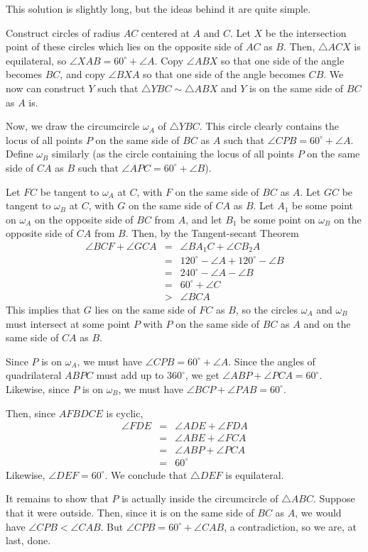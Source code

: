 \begin{mdsoln}
This solution is slightly long, but the ideas behind it are quite simple.

Construct circles of radius $AC$ centered at $A$ and $C$. Let $X$ be the intersection point of these circles which lies on the opposite side of $AC$ as $B$. Then, $\triangle ACX$ is equilateral, so $\angle XAB=60^\circ+\angle A$. Copy $\angle ABX$ so that one side of the angle becomes $BC$, and copy $\angle BXA$ so that one side of the angle becomes $CB$. We now can construct $Y$ such that $\triangle YBC\sim \triangle ABX$ and $Y$ is on the same side of $BC$ as $A$ is.

Now, we draw the circumcircle $\omega_A$ of $\triangle YBC$. This circle clearly contains the locus of all points $P$ on the same side of $BC$ as $A$ such that $\angle CPB=60^\circ+\angle A$. Define $\omega_B$ similarly (as the circle containing the locus of all points $P$ on the same side of $CA$ as $B$ such that $\angle APC=60^\circ+\angle B$).

Let $FC$ be tangent to $\omega_A$ at $C$, with $F$ on the same side of $BC$ as $A$. Let $GC$ be tangent to $\omega_B$ at $C$, with $G$ on the same side of $CA$ as $B$. Let $A_1$ be some point on $\omega_A$ on the opposite side of $BC$ from $A$, and let $B_1$ be some point on $\omega_B$ on the opposite side of $CA$ from $B$. Then, by the Tangent-secant Theorem\begin{eqnarray*}\angle BCF+\angle GCA&=&\angle BA_1C+\angle CB_2A\\ &=&120^\circ-\angle A+120^\circ -\angle B\\ &=&240^\circ-\angle A-\angle B\\ &=&60^\circ+\angle C\\ &>&\angle BCA\end{eqnarray*}This implies that $G$ lies on the same side of $FC$ as $B$, so the circles $\omega_A$ and $\omega_B$ must intersect at some point $P$ with $P$ on the same side of $BC$ as $A$ and on the same side of $CA$ as $B$.

Since $P$ is on $\omega_A$, we must have $\angle CPB=60^\circ+\angle A$. Since the angles of quadrilateral $ABPC$ must add up to $360^\circ$, we get $\angle ABP+\angle PCA=60^\circ$. Likewise, since $P$ is on $\omega_B$, we must have $\angle BCP+\angle PAB=60^\circ$.

Then, since $AFBDCE$ is cyclic,\begin{eqnarray*}\angle FDE&=&\angle ADE +\angle FDA \\ &=&\angle ABE +\angle FCA \\ &=&\angle ABP+\angle PCA\\ &=&60^\circ\end{eqnarray*}Likewise, $\angle DEF=60^\circ$. We conclude that $\triangle DEF$ is equilateral.

It remains to show that $P$ is actually inside the circumcircle of $\triangle ABC$. Suppose that it were outside. Then, since it is on the same side of $BC$ as $A$, we would have $\angle CPB<\angle CAB$. But $\angle CPB=60^\circ+\angle CAB$, a contradiction, so we are, at last, done.

\end{mdsoln}
